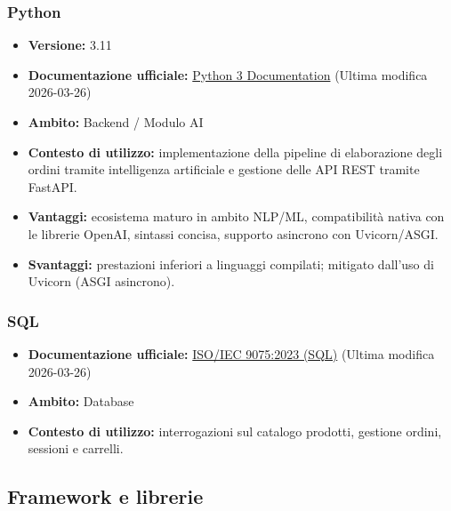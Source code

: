 \documentclass[a4paper, 11pt, oneside]{scrartcl}
\begin{document}
\subsubsection{Python}
\begin{itemize}[noitemsep]
\item \textbf{Versione:} 3.11
\item \textbf{Documentazione ufficiale:} \href{https://docs.python.org/3/}{Python 3 Documentation} (Ultima modifica 2026-03-26)
\item \textbf{Ambito:} Backend / Modulo AI
\item \textbf{Contesto di utilizzo:} implementazione della pipeline di elaborazione degli ordini tramite intelligenza artificiale e gestione delle API REST tramite FastAPI.
\item \textbf{Vantaggi:} ecosistema maturo in ambito NLP/ML, compatibilit\`a nativa con le librerie OpenAI, sintassi concisa, supporto asincrono con Uvicorn/ASGI.
\item \textbf{Svantaggi:} prestazioni inferiori a linguaggi compilati; mitigato dall'uso di Uvicorn (ASGI asincrono).
\end{itemize}

\subsubsection{SQL}
\begin{itemize}[noitemsep]
\item \textbf{Documentazione ufficiale:} \href{https://www.iso.org/standard/76584.html}{ISO/IEC 9075:2023 (SQL)} (Ultima modifica 2026-03-26)
\item \textbf{Ambito:} Database
\item \textbf{Contesto di utilizzo:} interrogazioni sul catalogo prodotti, gestione ordini, sessioni e carrelli.
\end{itemize}

\subsection{Framework e librerie}
\end{document}
